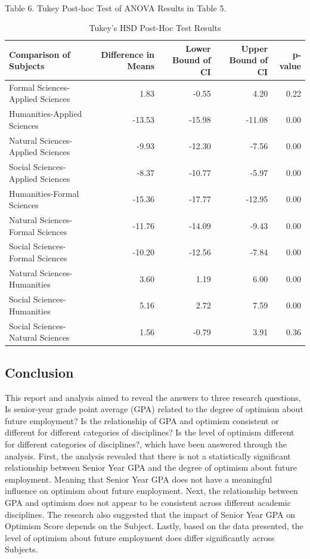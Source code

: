 \documentclass[
  letterpaper,
  DIV=11,
  numbers=noendperiod]{scrartcl}
\makeatletter
\let\oldparagraph\paragraph
\renewcommand{\paragraph}{
    \@ifstar
      \xxxParagraphStar
      \xxxParagraphNoStar
  }
\newcommand{\xxxParagraphStar}[1]{\oldparagraph*{#1}\mbox{}}
\newcommand{\xxxParagraphNoStar}[1]{\oldparagraph{#1}\mbox{}}
\makeatother
\begin{document}
\paragraph{Table 6. Tukey Post-hoc Test of ANOVA Results in Table
5.}\label{table-6.-tukey-post-hoc-test-of-anova-results-in-table-5.}

\begin{table}
\caption*{
{\large Tukey's HSD Post-Hoc Test Results}
} 
\fontsize{12.0pt}{14.4pt}\selectfont
\begin{tabular*}{\linewidth}{@{\extracolsep{\fill}}lrrrr}
\toprule
Comparison of Subjects & Difference in Means & Lower Bound of CI & Upper Bound of CI & p-value \\ 
\midrule\addlinespace[2.5pt]
Formal Sciences-Applied Sciences & 1.83 & -0.55 & 4.20 & 0.22 \\ 
Humanities-Applied Sciences & -13.53 & -15.98 & -11.08 & 0.00 \\ 
Natural Sciences-Applied Sciences & -9.93 & -12.30 & -7.56 & 0.00 \\ 
Social Sciences-Applied Sciences & -8.37 & -10.77 & -5.97 & 0.00 \\ 
Humanities-Formal Sciences & -15.36 & -17.77 & -12.95 & 0.00 \\ 
Natural Sciences-Formal Sciences & -11.76 & -14.09 & -9.43 & 0.00 \\ 
Social Sciences-Formal Sciences & -10.20 & -12.56 & -7.84 & 0.00 \\ 
Natural Sciences-Humanities & 3.60 & 1.19 & 6.00 & 0.00 \\ 
Social Sciences-Humanities & 5.16 & 2.72 & 7.59 & 0.00 \\ 
Social Sciences-Natural Sciences & 1.56 & -0.79 & 3.91 & 0.36 \\ 
\bottomrule
\end{tabular*}
\end{table}

\subsection{Conclusion}\label{conclusion}

This report and analysis aimed to reveal the answers to three research
questions, Is senior-year grade point average (GPA) related to the
degree of optimism about future employment? Is the relationship of GPA
and optimism consistent or different for different categories of
disciplines? Is the level of optimism different for different categories
of disciplines?, which have been answered through the analysis. First,
the analysis revealed that there is not a statistically significant
relationship between Senior Year GPA and the degree of optimism about
future employment. Meaning that Senior Year GPA does not have a
meaningful influence on optimism about future employment. Next, the
relationship between GPA and optimism does not appear to be consistent
across different academic disciplines. The research also suggested that
the impact of Senior Year GPA on Optimism Score depends on the Subject.
Lastly, based on the data presented, the level of optimism about future
employment does differ significantly across Subjects.
\end{document}
